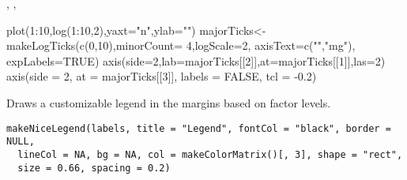\documentclass[a4paper]{book}
\begin{document}
%
\begin{SeeAlso}\relax
{}, , 
\end{SeeAlso}
%
\begin{Examples}
\begin{ExampleCode}
plot(1:10,log(1:10,2),yaxt="n",ylab="")
majorTicks<-makeLogTicks(c(0,10),minorCount= 4,logScale=2, axisText=c("","mg"), expLabels=TRUE)
axis(side=2,lab=majorTicks[[2]],at=majorTicks[[1]],las=2)
axis(side = 2, at = majorTicks[[3]], labels = FALSE, tcl = -0.2)
\end{ExampleCode}
\end{Examples}
%
\begin{Description}\relax
Draws a customizable legend in the margins based on factor levels.
\end{Description}
%
\begin{Usage}
\begin{verbatim}
makeNiceLegend(labels, title = "Legend", fontCol = "black", border = NULL,
  lineCol = NA, bg = NA, col = makeColorMatrix()[, 3], shape = "rect",
  size = 0.66, spacing = 0.2)
\end{verbatim}
\end{Usage}
%
\end{document}
